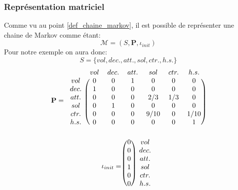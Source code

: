 \documentclass[letterpaper]{article}
\begin{document}
    \subsubsection{Représentation matriciel}
      Comme vu au point \ref{def_chaine_markov}, il est possible de représenter une
      chaine de Markov comme étant:
      $$\mathcal{M} = (S, \mathbf{P}, \iota_{init})$$
      Pour notre exemple on aura donc:
      $$S = \{vol, dec., att., sol, ctr., h.s.\} $$
      $$ \mathbf{P} = 
	\begin{blockarray}{ccccccc}
	& vol & dec. & att. & sol & ctr. & h.s. \\
	  \begin{block}{c(cccccc)}
	    vol  & 0 & 0 & 1 & 0    & 0   & 0    \\
	    dec. & 1 & 0 & 0 & 0    & 0   & 0    \\
	    att. & 0 & 0 & 0 & 2/3  & 1/3 & 0    \\
	    sol  & 0 & 1 & 0 & 0    & 0   & 0    \\
	    ctr. & 0 & 0 & 0 & 9/10 & 0   & 1/10 \\
	    h.s. & 0 & 0 & 0 & 0    & 0   & 1    \\
	  \end{block}
	\end{blockarray}
      $$
      $$\iota_{init} = 
	\begin{blockarray}{cc}
	  \begin{block}{( c ) c}
	    0 & vol \\
	    0 & dec.\\
	    0 & att.\\
	    1 & sol\\
	    0 & ctr.\\
	    0 & h.s.\\
	  \end{block}
	\end{blockarray}
      $$
      
\end{document}

